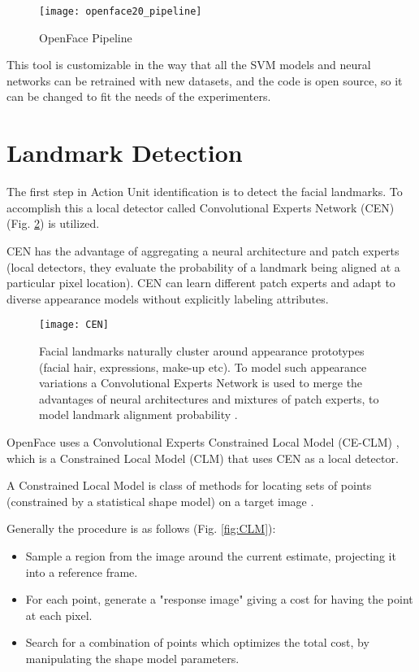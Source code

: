 \begin{figure}[H]
	\centering
	\texttt{[image: openface20\_pipeline]}
	\caption{OpenFace Pipeline \cite{Baltru2018}}
	\label{fig:openface20_pipeline}
\end{figure}

This tool is customizable in the way that all the SVM models and neural networks can be retrained with new datasets, and the code is open source, so it can be changed to fit the needs of the experimenters.


\clearpage

\section{Landmark Detection} \label{landmark_det}

The first step in Action Unit identification is to detect the facial landmarks. To accomplish this a local detector called Convolutional Experts Network (CEN) (Fig. \ref{fig:CEN}) is utilized. 

CEN has the advantage of aggregating a neural architecture and patch experts (local detectors, they evaluate the probability of a landmark being aligned at a particular pixel location). CEN can learn different patch experts and adapt to diverse appearance models without explicitly labeling attributes.

\begin{figure}[H]
	\centering
	\texttt{[image: CEN]}
	\caption{Facial landmarks naturally cluster around appearance prototypes (facial hair, expressions, make-up etc). To model such appearance variations a Convolutional Experts Network is used to merge the advantages of neural architectures and mixtures of patch experts, to model landmark alignment probability \cite{Baltru2017}.}
	\label{fig:CEN}
\end{figure}

OpenFace uses a Convolutional Experts Constrained Local Model (CE-CLM) \cite{Baltru2017}, which is a Constrained Local Model (CLM) that uses CEN as a local detector. 

A Constrained Local Model is class of methods for locating sets of points (constrained by a statistical shape model) on a target image \cite{clm_cootes}.

Generally the procedure is as follows (Fig. \ref{fig:CLM}):
\begin{itemize}[noitemsep]
	\item Sample a region from the image around the current estimate, projecting it into a reference frame.
	\item For each point, generate a "response image" giving a cost for having the point at each pixel.
	\item Search for a combination of points which optimizes the total cost, by manipulating the shape model parameters.
\end{itemize}

